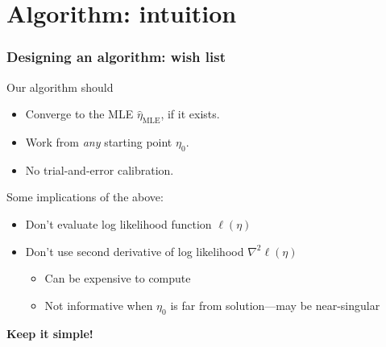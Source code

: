 \documentclass[ 10pt]{beamer}
\newcommand{\etaMLE}{\hat{\eta}_{\textrm{MLE}}}
\begin{document}
\section{Algorithm: intuition}
\frame
{
\frametitle{Designing an algorithm: wish list}

Our algorithm should
\begin{itemize}
\item Converge to the MLE $\etaMLE$, if it exists.
\item Work from \emph{any} starting point $\eta_0$.
\item No trial-and-error calibration.
\pause
\end{itemize}
\vspace{2mm}

\pause
Some implications of the above:
\begin{itemize}
\item Don't evaluate log likelihood function $\ell( \eta)$
\item Don't use second derivative of log likelihood $\nabla^2 \ell( \eta)$
\begin{itemize}
	\item Can be expensive to compute
	\item Not informative when $\eta_0$ is far from solution---may be near-singular
\end{itemize}
\end{itemize}
\textbf{Keep it simple!} %
}
\end{document}
